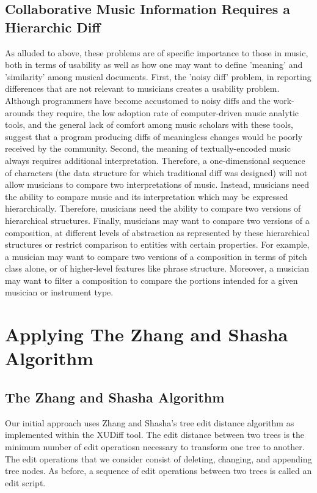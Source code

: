 \documentclass{article}
\begin{document}
\subsection{Collaborative Music Information Requires a Hierarchic Diff}
As alluded to above, these problems are of specific importance to
those in music, both in terms of usability as well as how one may want
to define 'meaning' and 'similarity' among musical documents.  First,
the 'noisy diff' problem, in reporting differences that are not
relevant to musicians creates a usability problem.  Although
programmers have become accustomed to noisy diffs and the work-arounds
they require, the low adoption rate of computer-driven music analytic
tools, and the general lack of comfort among music scholars with these
tools, suggest that a program producing diffs of meaningless changes
would be poorly received by the community.  Second, the meaning of
textually-encoded music always requires additional interpretation.
Therefore, a one-dimensional sequence of characters (the data
structure for which traditional diff was designed) will not allow
musicians to compare two interpretations of music.  Instead, musicians
need the ability to compare music and its interpretation which may be
expressed hierarchically.  Therefore, musicians need the ability to
compare two versions of hierarchical structures.  Finally, musicians
may want to compare two versions of a composition, at different levels
of abstraction as represented by these hierarchical structures or
restrict comparison to entities with certain properties.  For example,
a musician may want to compare two versions of a composition in terms
of pitch class alone, or of higher-level features like phrase structure. Moreover, a musician may want to filter a composition to
compare the portions intended for a given musician or instrument type.

\section{Applying The Zhang and Shasha Algorithm}
\subsection{The Zhang and Shasha Algorithm}
Our initial approach uses Zhang and Shasha's tree edit distance
algorithm as implemented within the XUDiff tool.  The edit distance
between two trees is the minimum number of edit operatiosn necessary
to transform one tree to another.  The edit operations that we
consider consist of deleting, changing, and appending tree nodes.  As
before, a sequence of edit operations between two trees is called an
edit script.
\end{document}
